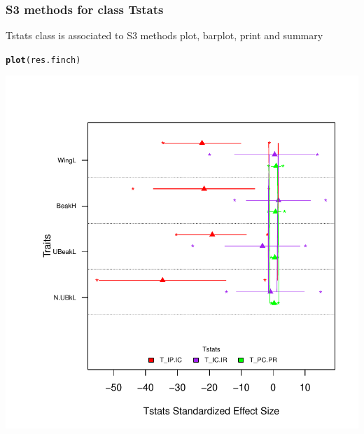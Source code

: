 \documentclass[12pt]{article}\usepackage[]{graphicx}\usepackage[]{color}
\makeatletter
\def\maxwidth{ %
  \ifdim\Gin@nat@width>\linewidth
    \linewidth
  \else
    \Gin@nat@width
  \fi
}
\newcommand{\hlstd}[1]{\textcolor[rgb]{0.345,0.345,0.345}{#1}}%
\newcommand{\hlkwd}[1]{\textcolor[rgb]{0.737,0.353,0.396}{\textbf{#1}}}%
\newenvironment{kframe}{%
 \def\at@end@of@kframe{}%
 \ifinner\ifhmode%
  \def\at@end@of@kframe{\end{minipage}}%
  \begin{minipage}{\columnwidth}%
 \fi\fi%
 \def\FrameCommand##1{\hskip\@totalleftmargin \hskip-\fboxsep
 \colorbox{shadecolor}{##1}\hskip-\fboxsep
     \hskip-\linewidth \hskip-\@totalleftmargin \hskip\columnwidth}%
 \MakeFramed {\advance\hsize-\width
   \@totalleftmargin\z@ \linewidth\hsize
   \@setminipage}}%
 {\par\unskip\endMakeFramed%
 \at@end@of@kframe}
\newenvironment{knitrout}{}{} %
\makeatother
\begin{document}
\subsubsection{S3 methods for class Tstats}
Tstats class is associated to S3 methods plot, barplot, print and summary

\begin{knitrout}
\color{fgcolor}\begin{kframe}
\begin{alltt}
\hlkwd{plot}\hlstd{(res.finch)}
\end{alltt}
\end{kframe}

{\centering \includegraphics[width=\maxwidth]{figure/unnamed-chunk-29} 

}



\end{knitrout}
\end{document}
